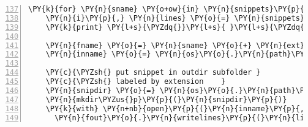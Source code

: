 \begin{Verbatim}[commandchars=\\\{\},numbers=left,numbersep=0.5em,firstnumber=137]
  \PY{k}{for} \PY{n}{sname} \PY{o+ow}{in} \PY{n}{snippets}\PY{p}{:}
    \PY{n}{i}\PY{p}{,} \PY{n}{lines} \PY{o}{=} \PY{n}{snippets}\PY{p}{[}\PY{n}{sname}\PY{p}{]}
    \PY{k}{print} \PY{l+s}{\PYZdq{}}\PY{l+s}{ }\PY{l+s}{\PYZdq{}}\PY{p}{,} \PY{n}{sname}\PY{p}{,} \PY{n}{i}\PY{p}{,} \PY{l+s}{\PYZdq{}}\PY{l+s}{\PYZhy{}}\PY{l+s}{\PYZdq{}}\PY{p}{,} \PY{n}{i}\PY{o}{+}\PY{n+nb}{len}\PY{p}{(}\PY{n}{lines}\PY{p}{)}\PY{o}{\PYZhy{}}\PY{l+m+mi}{1}
    
    \PY{n}{fname} \PY{o}{=} \PY{n}{sname} \PY{o}{+} \PY{n}{ext}
    \PY{n}{inname} \PY{o}{=} \PY{n}{os}\PY{o}{.}\PY{n}{path}\PY{o}{.}\PY{n}{join}\PY{p}{(}\PY{n}{outdir}\PY{p}{,} \PY{n}{fname}\PY{p}{)}
    
    \PY{c}{\PYZsh{} put snippet in outdir subfolder }
    \PY{c}{\PYZsh{} labeled by extension    }
    \PY{n}{snipdir} \PY{o}{=} \PY{n}{os}\PY{o}{.}\PY{n}{path}\PY{o}{.}\PY{n}{join}\PY{p}{(}\PY{n}{outdir}\PY{p}{,}\PY{n}{ext}\PY{p}{[}\PY{l+m+mi}{1}\PY{p}{:}\PY{p}{]}\PY{p}{)}
    \PY{n}{mkdir\PYZus{}p}\PY{p}{(}\PY{n}{snipdir}\PY{p}{)}
    \PY{k}{with} \PY{n+nb}{open}\PY{p}{(}\PY{n}{inname}\PY{p}{,} \PY{l+s}{\PYZdq{}}\PY{l+s}{w}\PY{l+s}{\PYZdq{}}\PY{p}{)} \PY{k}{as} \PY{n}{fout}\PY{p}{:}
      \PY{n}{fout}\PY{o}{.}\PY{n}{writelines}\PY{p}{(}\PY{n}{lines}\PY{p}{)}
\end{Verbatim}
